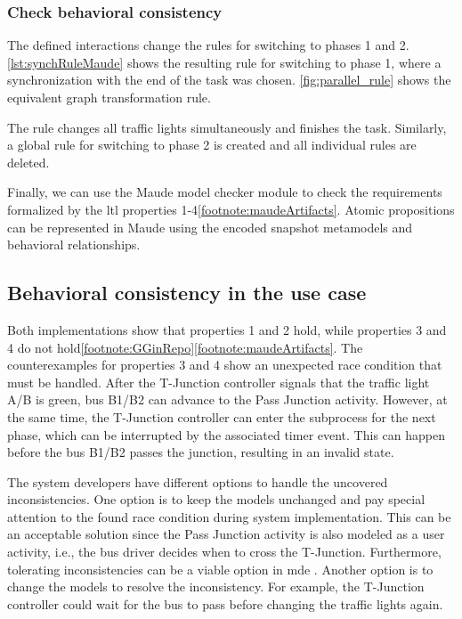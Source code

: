 \documentclass{jot}
\begin{document}
\subsubsection{Check behavioral consistency}
The defined interactions change the rules for switching to phases 1 and 2. \autoref{lst:synchRuleMaude} shows the resulting rule for switching to phase 1, where a synchronization with the end of the task was chosen.
\autoref{fig:parallel_rule} shows the equivalent graph transformation rule.



The rule changes all traffic lights simultaneously and finishes the task.
Similarly, a global rule for switching to phase 2 is created and all individual rules are deleted.

Finally, we can use the Maude model checker module to check the requirements formalized by the \gls*{ltl} properties 1-4\cref{footnote:maudeArtifacts}.
Atomic propositions can be represented in Maude using the encoded snapshot metamodels and behavioral relationships.

\subsection{Behavioral consistency in the use case}

Both implementations show that properties 1 and 2 hold, while properties 3 and 4 do not hold\cref{footnote:GGinRepo}\cref{footnote:maudeArtifacts}.
The counterexamples for properties 3 and 4 show an unexpected race condition that must be handled.
After the T-Junction controller signals that the traffic light A/B is green, bus B1/B2 can advance to the \textsf{Pass Junction} activity.
However, at the same time, the T-Junction controller can enter the subprocess for the next phase, which can be interrupted by the associated timer event.
This can happen before the bus B1/B2 passes the junction, resulting in an invalid state.

The system developers have different options to handle the uncovered inconsistencies.
One option is to keep the models unchanged and pay special attention to the found race condition during system implementation.
This can be an acceptable solution since the \textsf{Pass Junction} activity is also modeled as a user activity, i.e., the bus driver decides when to cross the T-Junction.
Furthermore, tolerating inconsistencies can be a viable option in \gls*{mde} \cite{weidmannToleranceModelDrivenEngineering2021}.
Another option is to change the models to resolve the inconsistency.
For example, the T-Junction controller could wait for the bus to pass before changing the traffic lights again.
\end{document}
